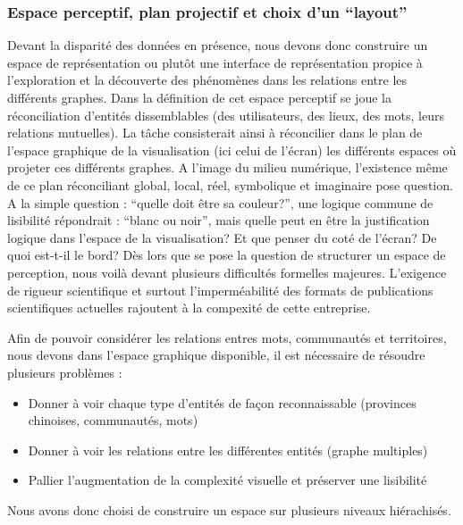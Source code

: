 \subsubsection{Espace perceptif, plan projectif et choix d{\textquoteright}un {\textquotedblleft}layout{\textquotedblright}}

Devant la disparité des données en présence, nous devons donc
construire un espace de représentation ou plut\^ot une interface de
représentation propice à l{\textquoteright}exploration et la
découverte des phénomènes dans les relations entre les
différents graphes. Dans la définition de cet espace perceptif se
joue la réconciliation d{\textquoteright}entités dissemblables (des
utilisateurs, des lieux, des mots, leurs relations mutuelles). La
t\^ache consisterait ainsi à réconcilier dans le plan de
l{\textquoteright}espace graphique de la visualisation (ici celui de
l{\textquoteright}écran) les différents espaces o\`u projeter ces
différents graphes. A l{\textquoteright}image du milieu numérique,
l{\textquoteright}existence m\^eme de ce plan réconciliant global,
local, réel, symbolique et imaginaire pose question. A la simple
question : {\textquotedblleft}quelle doit \^etre sa
couleur?{\textquotedblright}, une logique commune de lisibilité
répondrait : {\textquotedblleft}blanc ou noir{\textquotedblright},
mais quelle peut en \^etre la justification logique dans
l{\textquoteright}espace de la visualisation? Et que penser du coté
de l{\textquoteright}écran? De quoi est-t-il le bord? Dès lors que
se pose la question de structurer un espace de perception, nous voilà
devant plusieurs difficultés formelles majeures.
L{\textquoteright}exigence de rigueur scientifique et surtout
l{\textquoteright}imperméabilité des formats de publications
scientifiques actuelles rajoutent à la compexité de cette
entreprise.

Afin de pouvoir considérer les relations entres mots, communautés et
territoires, nous devons dans l{\textquoteright}espace graphique
disponible, il est nécessaire de résoudre plusieurs problèmes :

\begin{itemize}
\item Donner à voir chaque type d{\textquoteright}entités de
fa\c{c}on reconnaissable (provinces chinoises, communautés, mots)
\item Donner à voir les relations entre les différentes entités
(graphe multiples)
\item Pallier l{\textquoteright}augmentation de la complexité visuelle
et préserver une lisibilité
\end{itemize}
Nous avons donc choisi de construire un espace sur plusieurs niveaux
hiérachisés.

